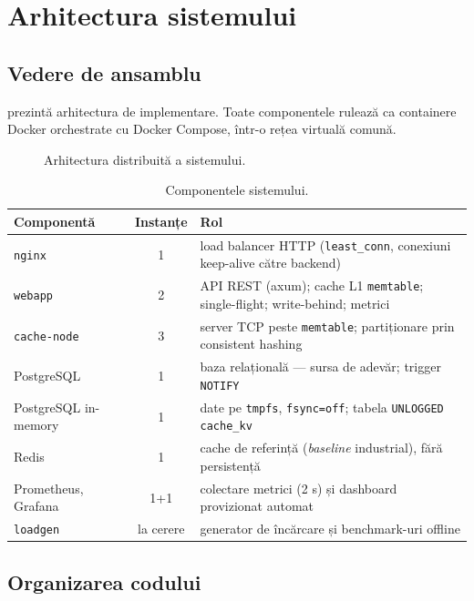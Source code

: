 \chapter{Arhitectura sistemului}
\label{ch:arhitectura}

\section{Vedere de ansamblu}

 prezintă arhitectura de implementare. Toate componentele rulează ca containere
Docker orchestrate cu Docker Compose, într-o rețea virtuală comună.

\begin{figure}[H]
  \centering
  \resizebox{\linewidth}{!}{}
  \caption{Arhitectura distribuită a sistemului.}
  \label{fig:arch}
\end{figure}

\begin{table}[H]
\centering\small
\begin{tabularx}{\linewidth}{lcX}
\toprule
Componentă & Instanțe & Rol \\
\midrule
\texttt{nginx} & 1 & load balancer HTTP (\texttt{least\_conn}, conexiuni keep-alive către backend) \\
\texttt{webapp} & 2 & API REST (axum); cache L1 \texttt{memtable}; single-flight; write-behind; metrici \\
\texttt{cache-node} & 3 & server TCP peste \texttt{memtable}; partiționare prin consistent hashing \\
PostgreSQL & 1 & baza relațională — sursa de adevăr; trigger \texttt{NOTIFY} \\
PostgreSQL in-memory & 1 & date pe \texttt{tmpfs}, \texttt{fsync=off}; tabela \texttt{UNLOGGED cache\_kv} \\
Redis & 1 & cache de referință (\emph{baseline} industrial), fără persistență \\
Prometheus, Grafana & 1+1 & colectare metrici (2 s) și dashboard provizionat automat \\
\texttt{loadgen} & la cerere & generator de încărcare și benchmark-uri offline \\
\bottomrule
\end{tabularx}
\caption{Componentele sistemului.}
\end{table}

\section{Organizarea codului}

